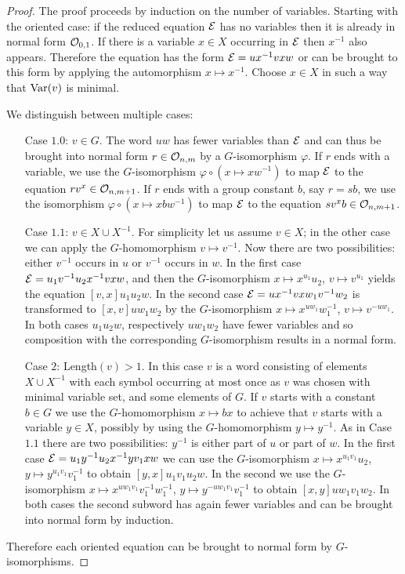 \documentclass[a4paper,11pt]{amsart}
\begin{document}
\begin{proof}
  The proof proceeds by induction on the number of variables.
  Starting with the oriented case: if the reduced equation $\mathcal{E}$ has no
  variables then it is already in normal form $\mathcal{O}_{0,1}$. If there is a
  variable $x\in X$ occurring in $\mathcal{E}$ then $x^{-1}$ also appears.
  Therefore the equation has the form
  $\mathcal{E} = ux^{-1}vxw$ or can be brought to this form by applying the
  automorphism $x \mapsto x^{-1}$. Choose $x\in X$ in such a way that
  $\textup{Var}(v)$ is minimal.
 
  We distinguish between multiple cases:
  \begin{itemize}
  \item[Case $1.0$:] $v\in G$. The word $uw$ has fewer variables than
    $\mathcal{E}$ and can thus be brought into normal form $r\in \mathcal{O}_{n,m}$ by a
    $G$-isomorphism $\varphi$. If $r$ ends with a variable, we use
    the $G$-isomorphism $\varphi \circ (x\mapsto xw^{-1}) $ to map $\mathcal{E}$
    to the equation $rv^x \in \mathcal{O}_{n,m+1}$.   
    If $r$ ends with a group constant $b$, say $r=sb$, we use the
    isomorphism $\varphi \circ(x \mapsto xbw^{-1}) $ to map $\mathcal{E}$ to the
    equation $sv^xb\in \mathcal{O}_{n,m+1}$.

  \item[Case $1.1$:] $v\in X\cup X^{-1}$. For simplicity let us assume
    $v\in X$; in the other case we can apply the $G$-homomorphism
    $v \mapsto v^{-1}$.
    Now there are two possibilities: either $v^{-1}$ occurs in $u$ or
    $v^{-1}$ occurs in $w$. In the first case $\mathcal{E}= u_1v^{-1}u_2x^{-1}vxw$, and
    then the $G$-isomorphism $x \mapsto x^{u_1}u_2$, $v \mapsto v^{u_1}$
    yields the equation $[v,x]u_1u_2w$. In the second case
    $\mathcal{E}= ux^{-1}vxw_1v^{-1}w_2$ is transformed to $[x,v]uw_1w_2$ by the
    $G$-isomorphism $x \mapsto x^{uw_1}w_1^{-1}$, $v\mapsto v^{-uw_1}$. In
    both cases $u_1u_2w$, respectively $uw_1w_2$ have fewer variables
    and so composition with the corresponding $G$-isomorphism results in a
    normal form.
  \item[Case $2$:] Length$(v)>1$. In this case $v$ is a word consisting of
    elements $X\cup X^{-1}$ with each symbol occurring at most once as
    $v$ was chosen with minimal variable set, and some elements of
    $G$.  If $v$ starts with a constant $b\in G$ we use the
    $G$-homomorphism $x\mapsto bx$ to achieve that $v$ starts with a
    variable $y\in X$, possibly by using the $G$-homomorphism 
    $y \mapsto y^{-1}$. As in Case
    $1.1$ there are two possibilities: $y^{-1}$ is either part of $u$
    or part of $w$. In the first case $\mathcal{E}= u_1 y^{-1} u_2 x^{-1}yv_1xw$
    we can use the $G$-isomorphism $x\mapsto x^{u_1v_1}u_2$,
    $y\mapsto y^{u_1v_1}v_1^{-1}$ to obtain $[y,x]u_1v_1u_2w$. In the
    second we use the $G$-isomorphism
    $x\mapsto x^{uw_1v_1}v_1^{-1}w_1^{-1}$,
    $y\mapsto y^{-uw_1v_1}v_1^{-1}$ to obtain $[x,y]uw_1v_1w_2$. In
    both cases the second subword has again fewer variables and can be
    brought into normal form by induction.
  \end{itemize}
  Therefore each oriented equation can be brought to normal form by 
  $G$-iso\-mor\-phisms.


\end{proof}
\end{document}
